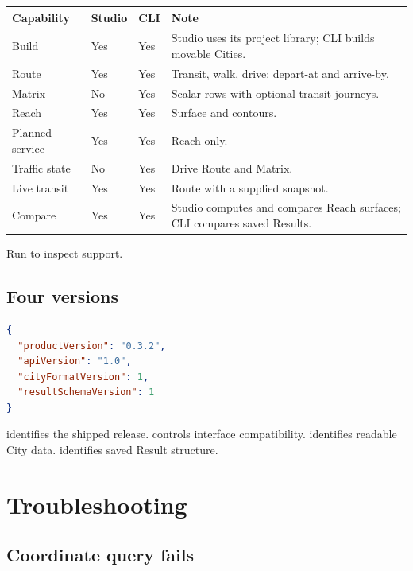\documentclass[10pt,letterpaper]{article}
\begin{document}
\begin{center}
\begin{tabularx}{\linewidth}{P{1.55in} Z Z Y}
\toprule
\textbf{Capability} & \textbf{Studio} & \textbf{CLI} & \textbf{Note} \\
\midrule
Build & Yes & Yes & Studio uses its project library; CLI builds movable Cities. \\
Route & Yes & Yes & Transit, walk, drive; depart-at and arrive-by. \\
Matrix & No & Yes & Scalar rows with optional transit journeys. \\
Reach & Yes & Yes & Surface and contours. \\
Planned service & Yes & Yes & Reach only. \\
Traffic state & No & Yes & Drive Route and Matrix. \\
Live transit & Yes & Yes & Route with a supplied snapshot. \\
Compare & Yes & Yes & Studio computes and compares Reach surfaces; CLI compares saved Results. \\
\bottomrule
\end{tabularx}
\end{center}

Run  to inspect support.

\subsection{Four versions}

\begin{lstlisting}[language=json]
{
  "productVersion": "0.3.2",
  "apiVersion": "1.0",
  "cityFormatVersion": 1,
  "resultSchemaVersion": 1
}
\end{lstlisting}

 identifies the shipped release.  controls interface compatibility.  identifies readable City data.  identifies saved Result structure.

\section{Troubleshooting}

\subsection{Coordinate query fails}
\end{document}
